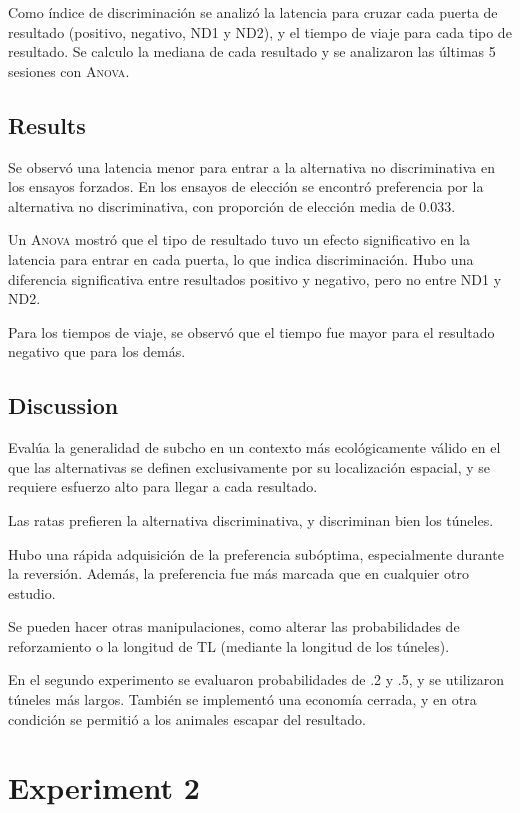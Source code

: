 \documentclass[a4paper,12pt]{article}
\begin{document}
Como índice de discriminación se analizó la latencia para cruzar cada puerta de resultado (positivo, negativo, ND1 y ND2), y el tiempo de viaje para cada tipo de resultado.
Se calculo la mediana de cada resultado y se analizaron las últimas 5 sesiones con {\scshape Anova}.

\subsection{Results}

Se observó una latencia menor para entrar a la alternativa no discriminativa en los ensayos forzados.
En los ensayos de elección se encontró preferencia por la alternativa no discriminativa, con proporción de elección media de 0.033.

Un {\scshape Anova} mostró que el tipo de resultado tuvo un efecto significativo en la latencia para entrar en cada puerta, lo que indica discriminación.
Hubo una diferencia significativa entre resultados positivo y negativo, pero no entre ND1 y ND2.

Para los tiempos de viaje, se observó que el tiempo fue mayor para el resultado negativo que para los demás.

\subsection{Discussion}

Evalúa la generalidad de subcho en un contexto más ecológicamente válido en el que las alternativas se definen exclusivamente por su localización espacial, y se requiere esfuerzo alto para llegar a cada resultado.

Las ratas prefieren la alternativa discriminativa, y discriminan bien los túneles.

Hubo una rápida adquisición de la preferencia subóptima, especialmente durante la reversión.
Además, la preferencia fue más marcada que en cualquier otro estudio.

Se pueden hacer otras manipulaciones, como alterar las probabilidades de reforzamiento o la longitud de TL (mediante la longitud de los túneles).

En el segundo experimento se evaluaron probabilidades de .2 y .5, y se utilizaron túneles más largos.
También se implementó una economía cerrada, y en otra condición se permitió a los animales escapar del resultado.

\section{Experiment 2}
\end{document}
